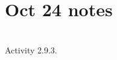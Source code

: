 \documentclass{article}
\begin{document}
\section*{Oct 24 notes}\\
Activity 2.9.3.\\
\end{document}
